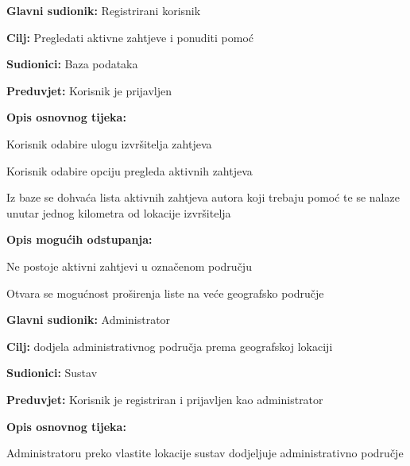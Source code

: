 \begin{packed_item}
	
	\item \textbf{Glavni sudionik: }Registrirani korisnik
	\item  \textbf{Cilj:} Pregledati aktivne zahtjeve i ponuditi pomoć
	\item  \textbf{Sudionici:} Baza podataka
	\item  \textbf{Preduvjet:} Korisnik je prijavljen
	\item  \textbf{Opis osnovnog tijeka:}
	
	\item[] \begin{packed_enum}
		
		\item Korisnik odabire ulogu izvršitelja zahtjeva
		\item Korisnik odabire opciju pregleda aktivnih zahtjeva
		\item Iz baze se dohvaća lista aktivnih zahtjeva autora koji trebaju pomoć te se nalaze unutar jednog kilometra od lokacije izvršitelja
	\end{packed_enum}
	
	\item  \textbf{Opis mogućih odstupanja:}
	
	\item[] \begin{packed_item}
		
		\item[2.a] Ne postoje aktivni zahtjevi u označenom području
		\item[] \begin{packed_enum}
			
			\item Otvara se mogućnost proširenja liste na veće geografsko područje
			
		\end{packed_enum}
	\end{packed_item}
\end{packed_item}

\noindent {}
\begin{packed_item}
	\item \textbf{Glavni sudionik: }Administrator
	\item  \textbf{Cilj:} dodjela administrativnog područja prema geografskoj lokaciji
	\item  \textbf{Sudionici:} Sustav
	\item  \textbf{Preduvjet:} Korisnik je registriran i prijavljen kao administrator
	\item  \textbf{Opis osnovnog tijeka:}
	
	\item[] \begin{packed_enum}
		
		\item Administratoru preko vlastite lokacije sustav dodjeljuje administrativno područje
	\end{packed_enum}
\end{packed_item}

